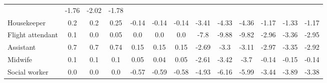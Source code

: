 \begin{table}[htbp!]
{\begin{tabular}{l|ccc|ccc|ccc|ccc}
&\cellcolor{red1} -1.76 & \cellcolor{red2} -2.02 & \cellcolor{red1} -1.78
\\
Housekeeper
& \cellcolor{green1} 0.2 & \cellcolor{green1} 0.2 & \cellcolor{green1} 0.25
&\cellcolor{red1} -0.14 & \cellcolor{red1} -0.14 & \cellcolor{red1} -0.14
&\cellcolor{red2} -3.41 & \cellcolor{red3} -4.33 & \cellcolor{red3} -4.36
&\cellcolor{red1} -1.17 & \cellcolor{red1} -1.33 & \cellcolor{red1} -1.17
\\
Flight attendant
& \cellcolor{green1} 0.1 & \cellcolor{green1} 0.0 & \cellcolor{green1} 0.05
&\cellcolor{green1} 0.0 & \cellcolor{green1} 0.0 & \cellcolor{green1} 0.0
&\cellcolor{red4} -7.8 & \cellcolor{red5} -9.88 & \cellcolor{red5} -9.82
&\cellcolor{red2} -2.96 & \cellcolor{red2} -3.36 & \cellcolor{red2} -2.95
\\
Assistant
& \cellcolor{green1} 0.7 & \cellcolor{green1} 0.7 & \cellcolor{green1} 0.74
&\cellcolor{green1} 0.15 & \cellcolor{green1} 0.15 & \cellcolor{green1} 0.15
&\cellcolor{red2} -2.69 & \cellcolor{red2} -3.3 & \cellcolor{red2} -3.11
&\cellcolor{red2} -2.97 & \cellcolor{red2} -3.35 & \cellcolor{red2} -2.92
\\
Midwife
& \cellcolor{green1} 0.1 & \cellcolor{green1} 0.1 & \cellcolor{green1} 0.1
&\cellcolor{green1} 0.05 & \cellcolor{green1} 0.04 & \cellcolor{green1} 0.05
&\cellcolor{red2} -2.61 & \cellcolor{red2} -3.42 & \cellcolor{red2} -3.7
&\cellcolor{red1} -0.14 & \cellcolor{red1} -0.15 & \cellcolor{red1} -0.14
\\
Social worker
& \cellcolor{green1} 0.0 & \cellcolor{green1} 0.0 & \cellcolor{green1} 0.0
&\cellcolor{red1} -0.57 & \cellcolor{red1} -0.59 & \cellcolor{red1} -0.58
&\cellcolor{red3} -4.93 & \cellcolor{red4} -6.16 & \cellcolor{red3} -5.99
&\cellcolor{red2} -3.44 & \cellcolor{red2} -3.89 & \cellcolor{red2} -3.38
\\

\bottomrule
\end{tabular}
}
\label{appendix:results-bias-mitigation-part3}
\end{table}
